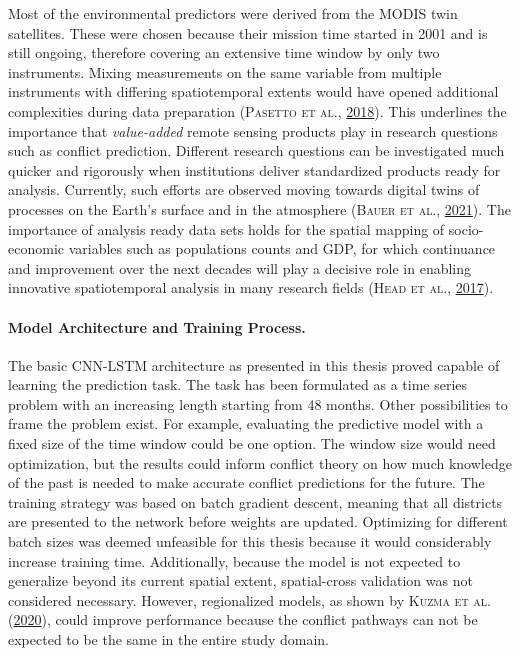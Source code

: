 \documentclass[a4paper,11pt]{article}
\begin{document}
Most of the environmental predictors were derived from the MODIS twin satellites.
These were chosen because their mission time started in 2001 and is still ongoing,
therefore covering an extensive time window by only two instruments. Mixing
measurements on the same variable from multiple instruments with differing
spatiotemporal extents would have opened additional complexities during data
preparation \textsc{(\textnormal{\textsc{Pasetto} \textsc{et al.}}, \textnormal{\protect\hyperlink{ref-pasetto2018}{2018}})}. This underlines the importance that
\emph{value-added} remote sensing products play in research questions such as conflict
prediction. Different research questions can be investigated much quicker and
rigorously when institutions deliver standardized products ready for analysis.
Currently, such efforts are observed moving towards digital twins of processes
on the Earth's surface and in the atmosphere \textsc{(\textnormal{\textsc{Bauer} \textsc{et al.}}, \textnormal{\protect\hyperlink{ref-bauer2021}{2021}})}. The importance of
analysis ready data sets holds for the spatial mapping of socio-economic variables
such as populations counts and GDP, for which continuance and improvement over
the next decades will play a decisive role in enabling innovative spatiotemporal
analysis in many research fields \textsc{(\textnormal{\textsc{Head} \textsc{et al.}}, \textnormal{\protect\hyperlink{ref-head2017}{2017}})}.

\hypertarget{model-architecture-and-training-process.}{%
\paragraph{Model Architecture and Training Process.}\label{model-architecture-and-training-process.}}

The basic CNN-LSTM architecture as presented in this thesis proved capable of
learning the prediction task. The task has been formulated as a time series
problem with an increasing length starting from 48 months. Other possibilities
to frame the problem exist. For example, evaluating the predictive model with
a fixed size of the time window could be one option. The window size would need
optimization, but the results could inform conflict theory on how much knowledge
of the past is needed to make accurate conflict predictions for the future.
The training strategy was based on batch gradient descent, meaning that all
districts are presented to the network before weights are updated. Optimizing
for different batch sizes was deemed unfeasible for this thesis because it would
considerably increase training time. Additionally, because the model is not
expected to generalize beyond its current spatial extent, spatial-cross validation
was not considered necessary. However, regionalized models, as shown by \textsc{\textnormal{Kuzma} \textnormal{et al.}} \textsc{(\textnormal{\protect\hyperlink{ref-kuzma2020}{2020}})},
could improve performance because the conflict pathways can not be expected to be
the same in the entire study domain.
\end{document}
